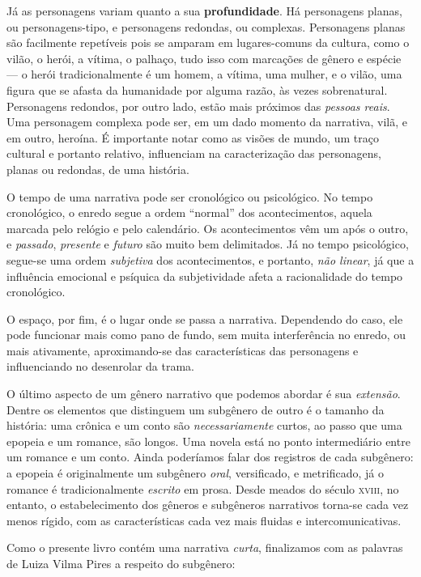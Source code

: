 \documentclass[11pt]{extarticle}
\begin{document}
Já as personagens variam quanto a sua \textbf{profundidade}. Há personagens planas, ou
personagens-tipo, e personagens redondas, ou complexas. Personagens planas
são facilmente repetíveis pois se amparam em lugares-comuns da cultura, como
o vilão, o herói, a vítima, o palhaço, tudo isso com marcações de gênero e espécie ---
o herói tradicionalmente é um homem, a vítima, uma mulher, e o vilão, uma figura que 
se afasta da humanidade por alguma razão, às vezes sobrenatural. 
Personagens redondos, por outro lado, estão mais próximos das \textit{pessoas reais}.
Uma personagem complexa pode ser, em um dado momento da narrativa, vilã, e em 
outro, heroína. É importante notar como as visões de mundo, um traço cultural e 
portanto relativo, influenciam na caracterização das personagens, planas 
ou redondas, de uma história.

O tempo de uma narrativa pode ser cronológico ou psicológico.
No tempo cronológico, o enredo segue a ordem ``normal'' dos acontecimentos,
aquela marcada pelo relógio e pelo calendário. Os acontecimentos vêm um após o 
outro, e \textit{passado}, \textit{presente} e \textit{futuro} são muito bem delimitados.
Já no tempo psicológico, segue-se uma ordem \textit{subjetiva} dos acontecimentos, 
e portanto, \textit{não linear}, já que a influência emocional e psíquica 
da subjetividade afeta a racionalidade do tempo cronológico. 

O espaço, por fim, é o lugar onde se passa a narrativa. Dependendo do caso, 
ele pode funcionar mais como pano de fundo, sem muita interferência
no enredo, ou mais ativamente, aproximando-se das características das personagens
e influenciando no desenrolar da trama. 

O último aspecto de um gênero narrativo que podemos abordar é sua 
\textit{extensão}. Dentre os elementos que distinguem um subgênero 
de outro é o tamanho da história: uma crônica e um conto são \textit{necessariamente}
curtos, ao passo que uma epopeia e um romance, são longos. Uma novela
está no ponto intermediário entre um romance e um conto.
Ainda poderíamos falar dos registros de cada subgênero: 
a epopeia é originalmente um subgênero \textit{oral}, versificado, e metrificado,
já o romance é tradicionalmente \textit{escrito} em prosa. 
Desde meados do século \textsc{xviii}, no entanto, o estabelecimento
dos gêneros e subgêneros narrativos torna-se cada vez menos rígido,
com as características cada vez mais fluidas e intercomunicativas.

Como o presente livro contém uma narrativa \textit{curta},
finalizamos com as palavras de Luiza Vilma Pires a respeito do
subgênero:
\end{document}
